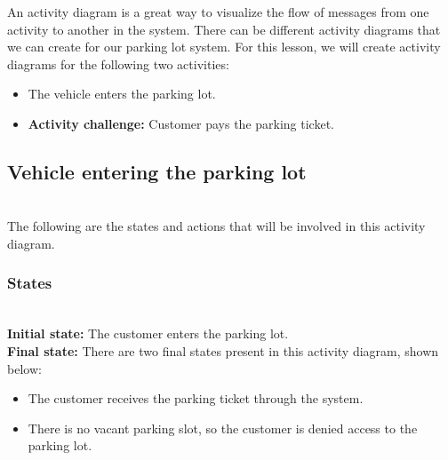 

An activity diagram is a great way to visualize the flow of messages from one activity to another in the system. There can be different activity diagrams that we can create for our parking lot system. For this lesson, we will create activity diagrams for the following two activities:

\begin{itemize}
\item
\protect{}\label{RfPyJ0ULta3W-nF0-Gk5j}
The vehicle enters the parking lot.
\item
\protect{}\label{CuQ7mq3zk-n22j4-50gdP}
\textbf{Activity challenge:} Customer pays the parking ticket.
\end{itemize}

\subsection{Vehicle entering the parking lot}\label{Xz3VksdTTnj4oxHLC94rY}
\\
The following are the states and actions that will be involved in this activity diagram.

\subsubsection{States}\label{d47qDFSzxJJdTDK7Dm7kd}
\\
\textbf{Initial state:} The customer enters the parking lot.
\\
\textbf{Final state:} There are two final states present in this activity diagram, shown below:

\begin{itemize}
\item
\protect{}\label{U0DnNrey23SHusPFeXlli}
The customer receives the parking ticket through the system.
\item
\protect{}\label{PJQn4h98mDi6o5ZcbhIf6}
There is no vacant parking slot, so the customer is denied access to the parking lot.
\end{itemize}

